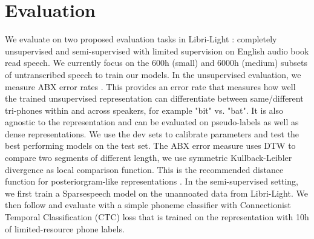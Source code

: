 \documentclass[a4paper]{article}
\begin{document}
\section{Evaluation}

We evaluate on two proposed evaluation tasks in Libri-Light \cite{kahn2019libri}: completely unsupervised and semi-supervised with limited supervision on English audio book read speech. We currently focus on the 600h (small) and 6000h (medium) subsets of untranscribed speech to train our models. In the unsupervised evaluation, we measure ABX error rates \cite{schatz2013evaluating, schatz2016abx}. This provides an error rate that measures how well the trained unsupervised representation can differentiate between same/different tri-phones within and across speakers, for example "bit" vs. "bat". It is also agnostic to the representation and can be evaluated on pseudo-labels as well as dense representations. We use the dev sets to calibrate parameters and test the best performing models on the test set. The ABX error measure uses DTW to compare two segments of different length, we use symmetric Kullback-Leibler divergence as local comparison function. This is the recommended distance function for posteriorgram-like representations \cite{dunbar2017zero, dunbar2019zero}. In the semi-supervised setting, we first train a Sparsespeech model on the unannoated data from Libri-Light. We then follow \cite{kahn2019libri} and evaluate with a simple phoneme classifier with Connectionist Temporal Classification (CTC) loss \cite{graves2006connectionist} that is trained on the representation with 10h of limited-resource phone labels. 

\begin{table}[th]
  \caption{ABX error rates on features/posteriograms generated by our model for the Libri-Light dev set with different temperatures .}
  \label{tab:ABX1}
  \centering
\end{table}
\end{document}
